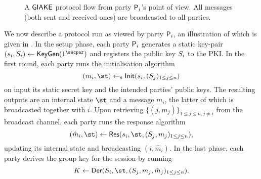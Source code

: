 \begin{figure}
	\centering 
	
	\caption{A $\GIAKE$ protocol flow from party $\User[i]$'s point of view. All messages (both sent and received ones) are broadcasted to all parties.}\label{fig:giakeprocedure}
\end{figure}

	We now describe a protocol run as viewed by party $\User[i]$, an illustration of which is given in .
	In the setup phase, each party $\User[i]$ generates a static key-pair $(\ssk_i,\spk_i) \gets \KeyGen(1^\secpar)$ and registers the public key $\spk_i$ to the PKI.
	In the first round, each party runs the initialisation algorithm \[(m_i,\st) \getsr \GAKEIni (\ssk_i,(\spk_j)_{1\leq j \leq n})\] on input its static secret key and the intended parties' public keys. 
	The resulting outputs are an internal state $\st$ and a message $m_i$, the latter of which is broadcasted together with $i$.
	Upon retrieving $\{(j,m_j)\}_{1\leq j \leq n, j \neq i}$ from the broadcast channel, each party runs the response algorithm \[(\hat{m}_i,\st) \gets \GAKERes(\ssk_i,\st,(\spk_j,m_j)_{1\leq j \leq n}),\] updating its internal state and broadcasting $(i,\hat{m}_i)$.
	In the last phase, each party derives the group key for the session by running \[K \gets \GAKEDer (\spk_i,\st,(\spk_j,m_j,\hat{m}_j)_{1\leq j \leq n}).\]
	
